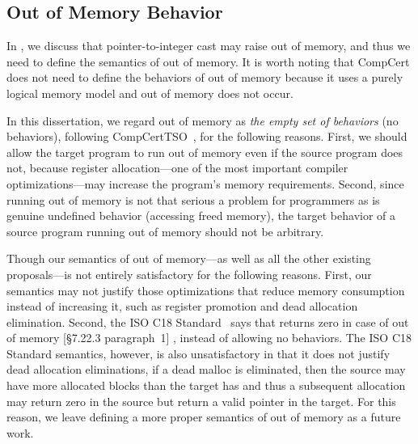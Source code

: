 \subsection{Out of Memory Behavior}
\label{sec:intptrcast:formal-semantics:oom}

In , we discuss that pointer-to-integer cast may
raise out of memory, and thus we need to define the semantics of out of memory.  It is worth noting
that CompCert does not need to define the behaviors of out of memory because it uses a purely
logical memory model and out of memory does not occur.

In this dissertation, we regard out of memory as \emph{the empty set of behaviors} (\ie no
behaviors), following CompCertTSO~\cite{vsevvcik2013compcerttso}, for the following reasons.  First,
we should allow the target program to run out of memory even if the source program does not, because
register allocation---one of the most important compiler optimizations---may increase the program's
memory requirements.  Second, since running out of memory is not that serious a problem for
programmers as is genuine undefined behavior (\eg accessing freed memory), the target behavior of a
source program running out of memory should not be arbitrary.

Though our semantics of out of memory---as well as all the other existing proposals---is not
entirely satisfactory for the following reasons.  First, our semantics may not justify those
optimizations that reduce memory consumption instead of increasing it, such as register promotion
and dead allocation elimination.  Second, the ISO C18 Standard~\cite{iso2018iec} says that
 returns zero in case of out of memory [\S7.22.3 paragraph~1] ,
instead of allowing no behaviors.  The ISO C18 Standard semantics, however, is also unsatisfactory
in that it does not justify dead allocation eliminations, \eg{} if a dead malloc is eliminated, then
the source may have more allocated blocks than the target has and thus a subsequent allocation may
return zero in the source but return a valid pointer in the target.  For this reason, we leave
defining a more proper semantics of out of memory as a future work.


